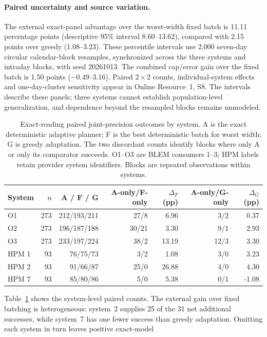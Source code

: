 \documentclass[12pt]{article}
\begin{document}
\paragraph{Paired uncertainty and source variation.}
The external exact-panel advantage over the worst-width fixed batch is
11.11 percentage points (descriptive 95\% interval 8.60--13.62), compared
with 2.15 points over greedy (1.08--3.23). These percentile intervals use
2,000 seven-day circular calendar-block resamples, synchronized across the
three systems and intraday blocks, with seed 20261013. The combined cap/error
gain over the fixed batch is 1.50 points ($-0.49$--3.16). Paired $2\times2$
counts, individual-system effects and one-day-cluster sensitivity appear in
Online Resource~1, S8. The intervals describe these panels; three systems
cannot establish population-level generalization, and dependence beyond
the resampled blocks remains unmodeled.
\begin{table}[htbp]
\centering\small
\setlength{\tabcolsep}{4pt}
\begin{tabular}{lrrrrrr}
\toprule
System & $n$ & A / F / G & A-only/F-only & $\Delta_F$ (pp) & A-only/G-only & $\Delta_G$ (pp)\\
\midrule
O1 & 273 & 212/193/211 & 27/8 & 6.96 & 3/2 & 0.37\\
O2 & 273 & 196/187/188 & 30/21 & 3.30 & 9/1 & 2.93\\
O3 & 273 & 233/197/224 & 38/2 & 13.19 & 12/3 & 3.30\\
HPM 1 & 93 & 76/75/73 & 3/2 & 1.08 & 3/0 & 3.23\\
HPM 2 & 93 & 91/66/87 & 25/0 & 26.88 & 4/0 & 4.30\\
HPM 7 & 93 & 85/80/86 & 5/0 & 5.38 & 0/1 & -1.08\\
\bottomrule
\end{tabular}
\caption{Exact-reading paired joint-precision outcomes by system. A is the exact deterministic adaptive planner; F is the best deterministic batch for worst width; G is greedy adaptation. The two discordant counts identify blocks where only A or only its comparator succeeds. O1--O3 are BLEM consumers 1--3; HPM labels retain provider system identifiers. Blocks are repeated observations within systems.}
\label{tab:joint_system_effects}
\end{table}
Table~\ref{tab:joint_system_effects} shows the system-level paired counts.
The external gain over fixed batching is heterogeneous: system~2 supplies
25 of the 31 net additional successes, while system~7 has one fewer success
than greedy adaptation. Omitting each system in turn leaves positive exact-model
\end{document}
